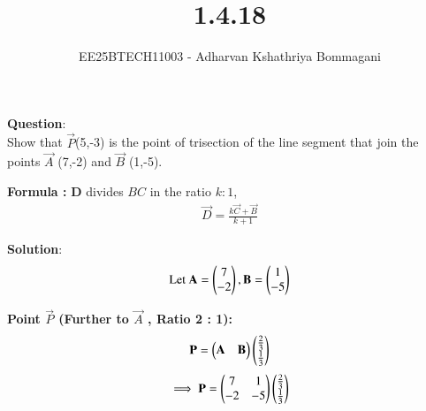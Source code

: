 \documentclass[journal]{IEEEtran}
\begin{document}

\vspace{3cm}

\title{1.4.18}
\author{EE25BTECH11003 - Adharvan Kshathriya Bommagani}
{\let\newpage\relax\maketitle}

\renewcommand{\thefigure}{\theenumi}
\renewcommand{\thetable}{\theenumi}
\setlength{\intextsep}{10pt} %
\textbf{Question}:\\
Show that $\vec{P}$(5,-3) is the point of trisection of the line segment that join the points  $\vec{A}$ (7,-2) and  $\vec{B}$ (1,-5).
\bigskip

\textbf{Formula :}   
\textbf{D} divides $BC$ in the ratio $k : 1$, 
\begin{align}
        \vec{D} = \frac{k\vec{C} + \vec{B}}{k + 1}
\end{align}
    


\textbf{Solution}:\\

\begin{align}
\text{Let } 
\mathbf{A} = \begin{pmatrix} 7 \\ -2 \end{pmatrix},
\mathbf{B} = \begin{pmatrix} 1 \\ -5 \end{pmatrix}
\end{align}


\textbf{Point  $\vec{P}$  (Further to  $\vec{A}$ , Ratio 2 : 1):}
\begin{align}
    \vec{P}=\begin{myvec}{\vec{A}& \vec{B}}\end{myvec}\begin{myvec}
        {\frac{2}{3}\\\frac{1}{3}}\end{myvec}    
\end{align}
\begin{align}
\implies \vec{P}=\begin{myvec}{ 7 & 1\\ -2 & -5 }\end{myvec}\begin{myvec}
        {\frac{2}{3}\\\frac{1}{3}}\end{myvec}
\end{align}
 
\end{document}
